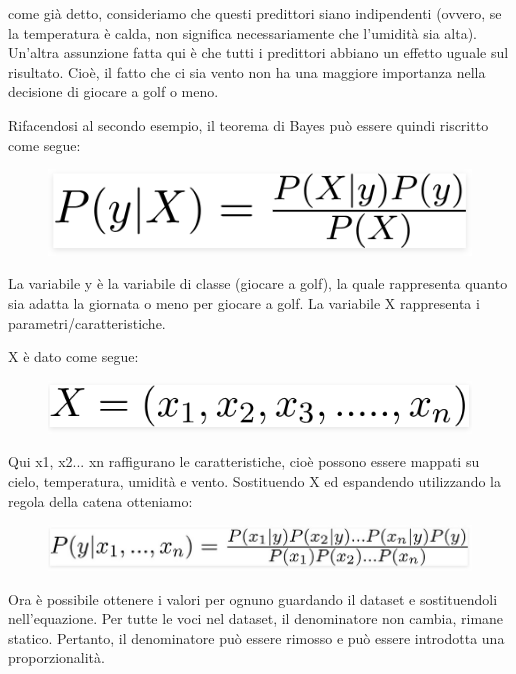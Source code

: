 come già detto, consideriamo che questi predittori siano indipendenti (ovvero, se la temperatura è calda, non significa necessariamente che l'umidità sia alta). Un'altra assunzione fatta qui è che tutti i predittori abbiano un eﬀetto uguale sul risultato. Cioè, il fatto che ci sia vento non ha una maggiore importanza nella  decisione di giocare a golf o meno. 

Rifacendosi al secondo esempio, il teorema di Bayes può essere quindi riscritto come segue:

\begin{figure}
    \begin{center}    
        \includegraphics[width=0.9\linewidth]{images/image19.png}
    \end{center}
\end{figure}
La variabile y è la variabile di classe (giocare a golf), la quale rappresenta quanto sia adatta la giornata o meno per giocare a golf. La variabile X rappresenta i parametri/caratteristiche.


X è dato come segue:
\begin{figure}
    \begin{center}    
        \includegraphics[width=0.9\linewidth]{images/image20.png}
    \end{center}
\end{figure}
Qui x1, x2... xn raffigurano le caratteristiche, cioè possono essere mappati su cielo, temperatura, umidità e vento. Sostituendo X ed espandendo utilizzando la regola della catena otteniamo:
\begin{figure}
    \begin{center}    
        \includegraphics[width=0.9\linewidth]{images/image21.jpeg}
    \end{center}
\end{figure}
Ora è possibile ottenere i valori per ognuno guardando il dataset e sostituendoli nell'equazione. Per tutte le voci nel dataset, il denominatore non cambia, rimane statico. Pertanto, il denominatore può essere rimosso e può essere introdotta una proporzionalità.

